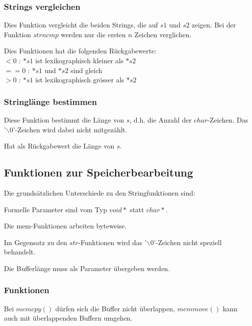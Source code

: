 		\begin{minipage}[t]{9 cm}
			\subsubsection{Strings vergleichen }
				
				\begin{compactitem}
					\item Dies Funktion vergleicht die beiden Strings, die auf $s1$ und $s2$ zeigen. Bei der Funktion $strncmp$ werden nur die ersten $n$ Zeichen verglichen.
					\item Dies Funktionen hat die folgenden Rückgabewerte: \\
						$<0$ : $*s1$ ist lexikographisch kleiner als $*s2$ \\
						$==0$ : $*s1$ und $*s2$ sind gleich \\
						$>0$ : $*s1$ ist lexikographisch grösser als $*s2$						
				\end{compactitem}
				
			\subsubsection{Stringlänge bestimmen }
				
				\begin{compactitem}
					\item Diese Funktion bestimmt die Länge von $s$, d.h. die Anzahl der $char$-Zeichen. Das '$\backslash0$'-Zeichen wird dabei nicht mitgezählt.
					\item Hat als Rückgabewert die Länge von $s$.
				\end{compactitem}
		\end{minipage}
		
		\subsection{Funktionen zur Speicherbearbeitung }
			Die grundsätzlichen Unterschiede zu den Stringfunktionen sind:
			\begin{compactitem}
				\item Formelle Parameter sind vom Typ $void*$ statt $char*$.
				\item Die mem-Funktionen arbeiten byteweise.
				\item Im Gegensatz zu den $str$-Funktionen wird das '$\backslash0$'-Zeichen nicht speziell behandelt.
				\item Die Bufferlänge muss als Parameter übergeben werden.
			\end{compactitem}
			
			\subsubsection{Funktionen }
				
				Bei $memcpy()$ dürfen sich die Buffer nicht überlappen, $memmove()$ kann auch mit überlappenden Buffern umgehen.